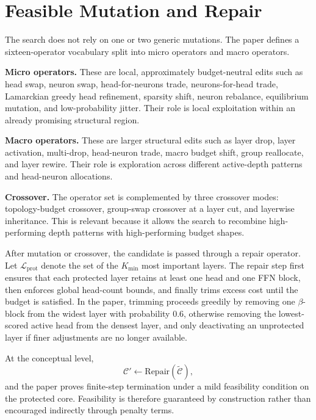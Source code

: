 \section{Feasible Mutation and Repair}
\label{subsec:mutation}

The search does not rely on one or two generic mutations. The paper defines a sixteen-operator vocabulary split into micro operators and macro operators.

\medskip\noindent\textbf{Micro operators.} These are local, approximately budget-neutral edits such as head swap, neuron swap, head-for-neurons trade, neurons-for-head trade, Lamarckian greedy head refinement, sparsity shift, neuron rebalance, equilibrium mutation, and low-probability jitter. Their role is local exploitation within an already promising structural region.

\medskip\noindent\textbf{Macro operators.} These are larger structural edits such as layer drop, layer activation, multi-drop, head-neuron trade, macro budget shift, group reallocate, and layer rewire. Their role is exploration across different active-depth patterns and head-neuron allocations.

\medskip\noindent\textbf{Crossover.} The operator set is complemented by three crossover modes: topology-budget crossover, group-swap crossover at a layer cut, and layerwise inheritance. This is relevant because it allows the search to recombine high-performing depth patterns with high-performing budget shapes.

After mutation or crossover, the candidate is passed through a repair operator. Let $\mathcal{L}_{\mathrm{prot}}$ denote the set of the $K_{\min}$ most important layers. The repair step first ensures that each protected layer retains at least one head and one FFN block, then enforces global head-count bounds, and finally trims excess cost until the budget is satisfied. In the paper, trimming proceeds greedily by removing one $\beta$-block from the widest layer with probability $0.6$, otherwise removing the lowest-scored active head from the densest layer, and only deactivating an unprotected layer if finer adjustments are no longer available.

At the conceptual level,
\begin{equation}
  \mathcal{C}' \leftarrow \mathrm{Repair}(\widetilde{\mathcal{C}}),
  \label{eq:design_repair}
\end{equation}
and the paper proves finite-step termination under a mild feasibility condition on the protected core. Feasibility is therefore guaranteed by construction rather than encouraged indirectly through penalty terms.

